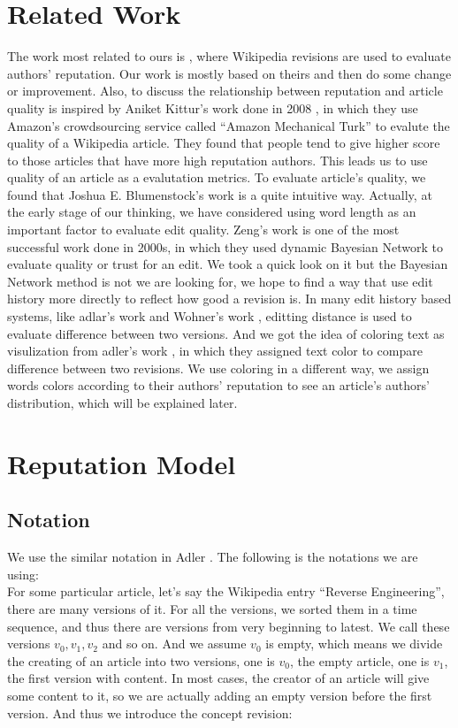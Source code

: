 \documentclass[preprint,review,12pt]{elsarticle}
\begin{document}
\section{Related Work}
The work most related to ours is \cite{adler2007content}, where Wikipedia
revisions are used to evaluate authors' reputation. Our work is mostly based on
theirs and then do some change or improvement. Also, to discuss the relationship
between reputation and article quality is inspired by Aniket Kittur's work done
in 2008 \cite{kittur2008can}, in which they use Amazon's crowdsourcing service
called ``Amazon Mechanical Turk'' to evalute the quality of a Wikipedia article.
They found that people tend to give higher score to those articles that have
more high reputation authors. This leads us to use quality of an article as a
evalutation metrics. To evaluate article's quality, we found that Joshua E.
Blumenstock's work \cite{blumenstock2008size} is a quite intuitive way.
Actually, at the early stage of our thinking, we have considered using word
length as an important factor to evaluate edit quality. Zeng's work
\cite{zeng2006computing} is one of the most successful work done in 2000s, in
which they used dynamic Bayesian Network to evaluate quality or trust for an edit. We
took a quick look on it but the Bayesian Network method is not we are looking
for, we hope to find a way that use edit history more directly to reflect how
good a revision is. In many edit history based systems, like adlar's work
\cite{adler2007content} and Wohner's work \cite{wohner2009assessing}, editting
distance is used to evaluate difference between two versions. And we got the
idea of coloring text as visulization from adler's work
\cite{adler2008assigning}, in which they assigned text color to compare
difference between two revisions. We use coloring in a different way, we assign
words colors according to their authors' reputation to see an article's authors'
distribution, which will be explained later.

\section{Reputation Model}
\subsection{Notation}
We use the similar notation in Adler \cite{adler2007content}. The following is
the notations we are using:\\
For some particular article, let's say the Wikipedia entry ``Reverse
Engineering'', there are many versions of it.
For all the versions, we sorted them in a time sequence, and thus there are
versions from very beginning to latest. We call these versions $v_0, v_1, v_2$
and so on. And we assume $v_0$ is empty, which means we divide the creating of
an article into two versions, one is $v_0$, the empty article, one is $v_1$, the
first version with content. In most cases, the creator of an article will give
some content to it, so we are actually adding an empty version before the first
version. And thus we introduce the concept revision:\\
\end{document}
